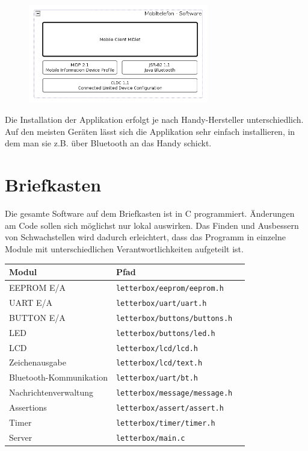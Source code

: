 \documentclass[ngerman]{article}
\begin{document}
\begin{figure}[h!] \begin{center}
    \includegraphics[width=0.7\textwidth]{media/mobile-client-arch}
\end{center} \end{figure}

Die Installation der Applikation erfolgt je nach Handy-Hersteller unterschiedlich. Auf den
meisten Geräten lässt sich die Applikation sehr einfach installieren, in dem man sie z.B.
über Bluetooth an das Handy schickt. 


\section{Briefkasten}

Die gesamte Software auf dem Briefkasten ist in C programmiert. Änderungen
am Code sollen sich möglichst nur lokal auswirken. Das Finden und Ausbessern von 
Schwachstellen wird dadurch erleichtert, dass das Programm in einzelne Module
mit unterschiedlichen Verantwortlichkeiten aufgeteilt ist.

\begin{tabular}{|l|l|l|}
    \hline
    {\bf Modul} & {\bf Pfad} & \\
    \hline
    \hline
    EEPROM E/A & {\tt letterbox/eeprom/eeprom.h} & \\
    \hline
    UART E/A & {\tt letterbox/uart/uart.h} & \\
    \hline
    BUTTON E/A & {\tt letterbox/buttons/buttons.h} & \\
    \hline
    LED & {\tt letterbox/buttons/led.h} & \\
    \hline
    LCD & {\tt letterbox/lcd/lcd.h} & \\
    \hline
    Zeichenausgabe & {\tt letterbox/lcd/text.h} & \\
    \hline
    Bluetooth-Kommunikation & {\tt letterbox/uart/bt.h} & \\
    \hline
    Nachrichtenverwaltung & {\tt letterbox/message/message.h} & \\
    \hline
    Assertions & {\tt letterbox/assert/assert.h} &  \\
    \hline
    Timer & {\tt letterbox/timer/timer.h} & \\
    \hline
    Server  & {\tt letterbox/main.c} & \\
    \hline
\end{tabular}
\end{document}
